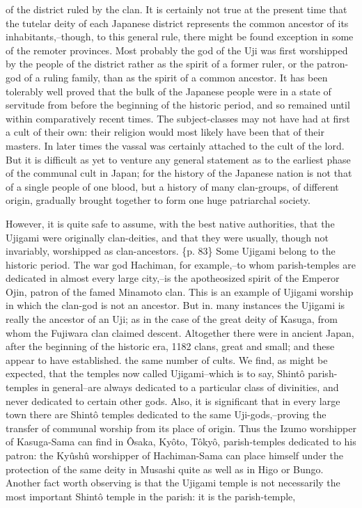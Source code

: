 of the district ruled by the clan. It is certainly not true at the present time that the tutelar deity of each Japanese district represents the common ancestor of its inhabitants,--though, to this general rule, there might be found exception in some of the remoter provinces. Most probably the god of the Uji was first worshipped by the people of the district rather as the spirit of a former ruler, or the patron-god of a ruling family, than as the spirit of a common ancestor. It has been tolerably well proved that the bulk of the Japanese people were in a state of servitude from before the beginning of the historic period, and so remained until within comparatively recent times. The subject-classes may not have had at first a cult of their own: their religion would most likely have been that of their masters. In later times the vassal was certainly attached to the cult of the lord. But it is difficult as yet to venture any general statement as to the earliest phase of the communal cult in Japan; for the history of the Japanese nation is not that of a single people of one blood, but a history of many clan-groups, of different origin, gradually brought together to form one huge patriarchal society.



However, it is quite safe to assume, with the best native authorities, that the Ujigami were originally clan-deities, and that they were usually, though not invariably, worshipped as clan-ancestors. \{p. 83\} Some Ujigami belong to the historic period. The war god Hachiman, for example,--to whom parish-temples are dedicated in almost every large city,--is the apotheosized spirit of the Emperor Ojin, patron of the famed Minamoto clan. This is an example of Ujigami worship in which the clan-god is not an ancestor. But in. many instances the Ujigami is really the ancestor of an Uji; as in the case of the great deity of Kasuga, from whom the Fujiwara clan claimed descent. Altogether there were in ancient Japan, after the beginning of the historic era, 1182 clans, great and small; and these appear to have established. the same number of cults. We find, as might be expected, that the temples now called Ujigami--which is to say, Shintô parish-temples in general--are always dedicated to a particular class of divinities, and never dedicated to certain other gods. Also, it is significant that in every large town there are Shintô temples dedicated to the same Uji-gods,--proving the transfer of communal worship from its place of origin. Thus the Izumo worshipper of Kasuga-Sama can find in Ôsaka, Kyôto, Tôkyô, parish-temples dedicated to his patron: the Kyûshû worshipper of Hachiman-Sama can place himself under the protection of the same deity in Musashi quite as well as in Higo or Bungo. Another fact worth observing is that the Ujigami temple is not necessarily the most important Shintô temple in the parish: it is the parish-temple,

